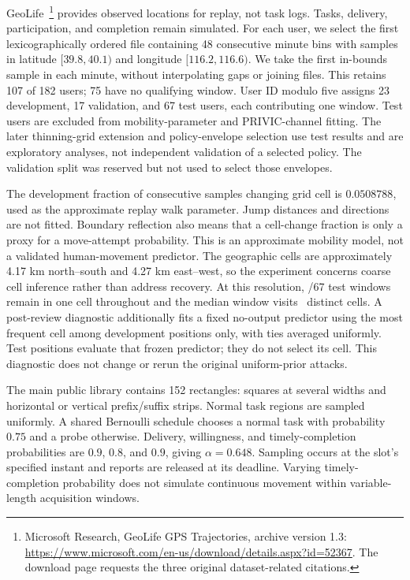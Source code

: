 \documentclass[3p,times]{elsarticle}
\begin{document}
GeoLife~\cite{geolife2009,geolife2008,geolife2010}\footnote{Microsoft Research, GeoLife GPS Trajectories, archive version 1.3: \url{https://www.microsoft.com/en-us/download/details.aspx?id=52367}. The download page requests the three original dataset-related citations.} provides observed locations for replay, not task logs. Tasks, delivery, participation, and completion remain simulated. For each user, we select the first lexicographically ordered file containing 48 consecutive minute bins with samples in latitude $[39.8,40.1)$ and longitude $[116.2,116.6)$. We take the first in-bounds sample in each minute, without interpolating gaps or joining files. This retains 107 of 182 users; 75 have no qualifying window. User ID modulo five assigns 23 development, 17 validation, and 67 test users, each contributing one window. Test users are excluded from mobility-parameter and PRIVIC-channel fitting. The later thinning-grid extension and policy-envelope selection use test results and are exploratory analyses, not independent validation of a selected policy. The validation split was reserved but not used to select those envelopes.

The development fraction of consecutive samples changing grid cell is $0.0508788$, used as the approximate replay walk parameter. Jump distances and directions are not fitted. Boundary reflection also means that a cell-change fraction is only a proxy for a move-attempt probability. This is an approximate mobility model, not a validated human-movement predictor. The geographic cells are approximately 4.17 km north--south and 4.27 km east--west, so the experiment concerns coarse cell inference rather than address recovery. At this resolution, \ReplayStaticWindows/67 test windows remain in one cell throughout and the median window visits \ReplayMedianCells\ distinct cells. A post-review diagnostic additionally fits a fixed no-output predictor using the most frequent cell among development positions only, with ties averaged uniformly. Test positions evaluate that frozen predictor; they do not select its cell. This diagnostic does not change or rerun the original uniform-prior attacks.

The main public library contains 152 rectangles: squares at several widths and horizontal or vertical prefix/suffix strips. Normal task regions are sampled uniformly. A shared Bernoulli schedule chooses a normal task with probability $0.75$ and a probe otherwise. Delivery, willingness, and timely-completion probabilities are $0.9$, $0.8$, and $0.9$, giving $\alpha=0.648$. Sampling occurs at the slot's specified instant and reports are released at its deadline. Varying timely-completion probability does not simulate continuous movement within variable-length acquisition windows.
\end{document}

